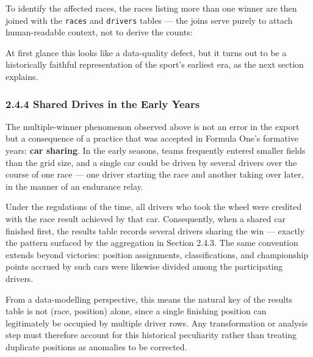\documentclass[
]{article}
\begin{document}
To identify the affected races, the races listing more than one winner
are then joined with the \texttt{races} and \texttt{drivers} tables ---
the joins serve purely to attach human-readable context, not to derive
the counts:

\begin{table}[!h]
\centering\begingroup\fontsize{8}{10}\selectfont

\endgroup{}
\end{table}

At first glance this looks like a data-quality defect, but it turns out
to be a historically faithful representation of the sport's earliest
era, as the next section explains.

\subsubsection{2.4.4 Shared Drives in the Early
Years}\label{shared-drives-in-the-early-years}

The multiple-winner phenomenon observed above is not an error in the
export but a consequence of a practice that was accepted in Formula
One's formative years: \textbf{car sharing}. In the early seasons, teams
frequently entered smaller fields than the grid size, and a single car
could be driven by several drivers over the course of one race --- one
driver starting the race and another taking over later, in the manner of
an endurance relay.

Under the regulations of the time, all drivers who took the wheel were
credited with the race result achieved by that car. Consequently, when a
shared car finished first, the results table records several drivers
sharing the win --- exactly the pattern surfaced by the aggregation in
Section 2.4.3. The same convention extends beyond victories: position
assignments, classifications, and championship points accrued by such
cars were likewise divided among the participating drivers.

From a data-modelling perspective, this means the natural key of the
results table is not (race, position) alone, since a single finishing
position can legitimately be occupied by multiple driver rows. Any
transformation or analysis step must therefore account for this
historical peculiarity rather than treating duplicate positions as
anomalies to be corrected.
\end{document}

